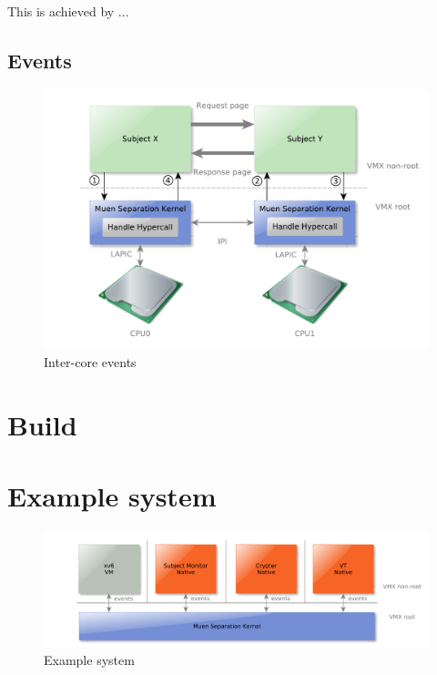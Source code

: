 This is achieved by ...

\subsection{Events}
\begin{figure}[h]
	\centering
	\includegraphics[width=\textwidth]{images/inter-core-events}
	\caption{Inter-core events}
	\label{fig:inter-core-events}
\end{figure}
\section{Build}
\section{Example system}
\begin{figure}[h]
	\centering
	\includegraphics[width=\textwidth]{images/architecture-example_system}
	\caption{Example system}
	\label{fig:example-system}
\end{figure}
